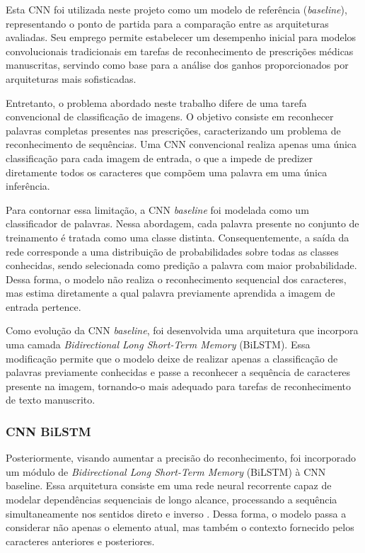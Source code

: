 \documentclass[11pt,a4paper]{article}
\begin{document}
Esta CNN foi utilizada neste projeto como um modelo de referência (\textit{baseline}), representando o ponto de partida para a comparação entre as arquiteturas avaliadas. Seu emprego permite estabelecer um desempenho inicial para modelos convolucionais tradicionais em tarefas de reconhecimento de prescrições médicas manuscritas, servindo como base para a análise dos ganhos proporcionados por arquiteturas mais sofisticadas.

Entretanto, o problema abordado neste trabalho difere de uma tarefa convencional de classificação de imagens. O objetivo consiste em reconhecer palavras completas presentes nas prescrições, caracterizando um problema de reconhecimento de sequências. Uma CNN convencional realiza apenas uma única classificação para cada imagem de entrada, o que a impede de predizer diretamente todos os caracteres que compõem uma palavra em uma única inferência.

Para contornar essa limitação, a CNN \textit{baseline} foi modelada como um classificador de palavras. Nessa abordagem, cada palavra presente no conjunto de treinamento é tratada como uma classe distinta. Consequentemente, a saída da rede corresponde a uma distribuição de probabilidades sobre todas as classes conhecidas, sendo selecionada como predição a palavra com maior probabilidade. Dessa forma, o modelo não realiza o reconhecimento sequencial dos caracteres, mas estima diretamente a qual palavra previamente aprendida a imagem de entrada pertence.

Como evolução da CNN \textit{baseline}, foi desenvolvida uma arquitetura que incorpora uma camada \textit{Bidirectional Long Short-Term Memory} (BiLSTM). Essa modificação permite que o modelo deixe de realizar apenas a classificação de palavras previamente conhecidas e passe a reconhecer a sequência de caracteres presente na imagem, tornando-o mais adequado para tarefas de reconhecimento de texto manuscrito.

\newpage
\subsubsection{CNN BiLSTM}

Posteriormente, visando aumentar a precisão do reconhecimento, foi incorporado um módulo de \textit{Bidirectional Long Short-Term Memory} (BiLSTM) à CNN baseline. Essa arquitetura consiste em uma rede neural recorrente capaz de modelar dependências sequenciais de longo alcance, processando a sequência simultaneamente nos sentidos direto e inverso \cite{shi2016crnn}. Dessa forma, o modelo passa a considerar não apenas o elemento atual, mas também o contexto fornecido pelos caracteres anteriores e posteriores.
\end{document}
